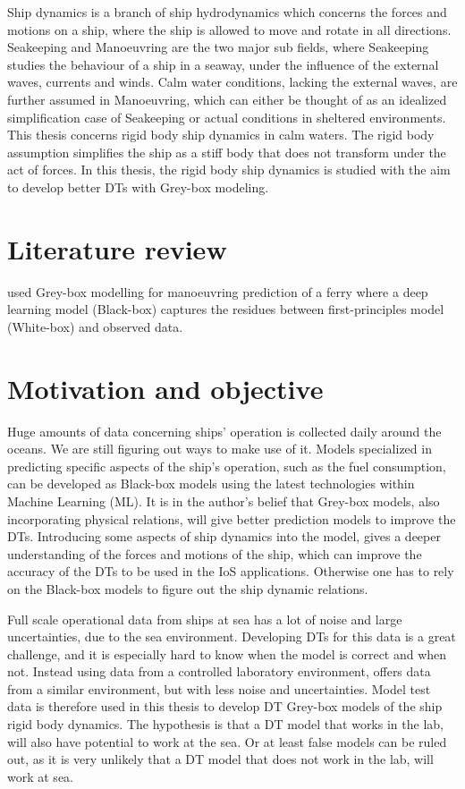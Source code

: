Ship dynamics is a branch of ship hydrodynamics which concerns the forces and motions on a ship, where the ship is allowed to move and rotate in all directions. Seakeeping and Manoeuvring are the two major sub fields, where Seakeeping studies the  behaviour of a ship in a seaway, under the influence of the external waves, currents and winds. Calm water conditions, lacking the external waves, are further assumed in Manoeuvring, which can either be thought of as an idealized simplification case of Seakeeping or actual conditions in sheltered environments. This thesis concerns rigid body ship dynamics in calm waters. The rigid body assumption simplifies the ship as a stiff body that does not transform under the act of forces. In this thesis, the rigid body ship dynamics is studied with the aim to develop better DTs with Grey-box modeling.

\section{Literature review}
\cite{nielsen_machine_2022} used Grey-box modelling for manoeuvring prediction of a ferry where a deep learning model (Black-box) captures the residues between first-principles model (White-box) and observed data.

\section{Motivation and objective}
\label{sec:motivation}
Huge amounts of data concerning ships' operation is collected daily around the oceans. We are still figuring out ways to make use of it. Models specialized in predicting specific aspects of the ship's operation, such as the fuel consumption, can be developed as Black-box models using the latest technologies within Machine Learning (ML). It is in the author's belief that Grey-box models, also incorporating physical relations, will give better prediction models to improve the DTs. Introducing some aspects of ship dynamics into the model, gives a deeper understanding of the forces and motions of the ship, which can improve the accuracy of the DTs to be used in the IoS applications. Otherwise one has to rely on the Black-box models to figure out the ship dynamic relations. 

Full scale operational data from ships at sea has a lot of noise and large uncertainties, due to the sea environment. Developing DTs for this data is a great challenge, and it is especially hard to know when the model is correct and when not. Instead using data from a controlled laboratory environment, offers data from a similar environment, but with less noise and uncertainties. 
Model test data is therefore used in this thesis to develop DT Grey-box models of the ship rigid body dynamics. The hypothesis is that a DT model that works in the lab, will also have potential to work at the sea. Or at least false models can be ruled out, as it is very unlikely that a DT model that does not work in the lab, will work at sea. 

